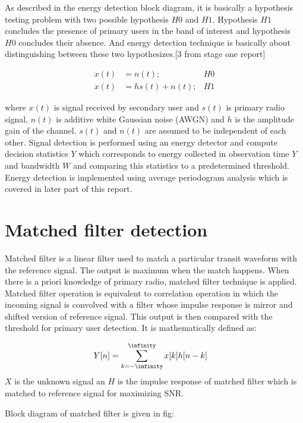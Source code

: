 As described in the energy detection block diagram, it is basically a hypothesis
testing problem with two possible hypothesis $H0$ and $H1$. Hypothesis $H1$ concludes 
the presence of primary users in the band of interest and hypothesis $H0$ 
concludes their absence. And energy detection technique is basically about 
distinguishing between these two hypothesizes.[3 from stage one report]

\begin{align}
x(t) & = n(t); & H0 \nonumber \\
x(t) & = hs(t)+n(t); & H1 \nonumber
\end{align}

where $x(t)$ is signal received by secondary user and $s(t)$ is primary radio 
signal, $n(t)$ is additive white Gaussian noise (AWGN) and $h$ is the amplitude gain
of the channel. $s(t)$ and $n(t)$ are assumed to be independent of each other. 
Signal detection is performed using an energy detector and compute decision 
statistics $Y$ which corresponds to energy collected in observation time $Y$ and 
bandwidth $W$ and comparing this statistics to a predetermined threshold. Energy 
detection is implemented using average periodogram analysis which is covered in 
later part of this report.


\section{Matched filter detection}
Matched filter is a linear filter used to match a particular transit waveform 
with the reference signal. The output is maximum when the match happens. When 
there is a priori knowledge of primary radio, matched filter technique is 
applied. Matched filter operation is equivalent to correlation operation in 
which the incoming signal is convolved with a filter whose impulse response is 
mirror and shifted version of reference signal. This output is then compared 
with the threshold for primary user detection. It is mathematically defined as:

\begin{align}
Y[n] &= \sum_{k=-\infinity}^{\infinity} x[k]h[n-k] \nonumber
\end{align}
$X$ is the unknown signal an $H$ is the impulse response of matched filter which is 
matched to reference signal for maximizing SNR. 

Block diagram of matched filter is given in fig:

